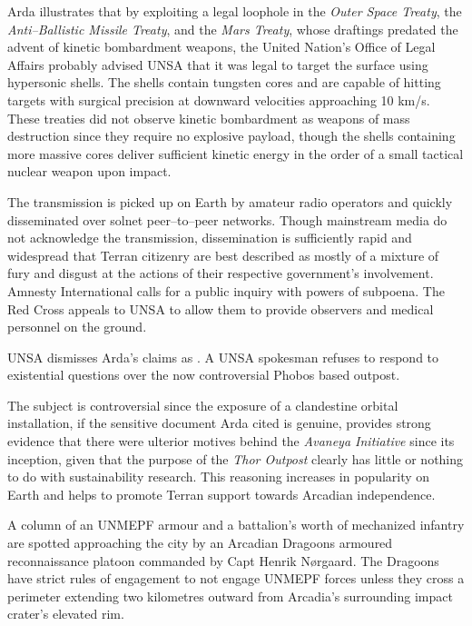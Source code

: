 Arda illustrates that by exploiting a legal loophole in the {\it Outer Space Treaty}, the {\it Anti--Ballistic Missile Treaty}, and the {\it Mars Treaty}, whose draftings predated the advent of kinetic bombardment weapons, the United Nation's Office of Legal Affairs probably advised UNSA that it was legal to target the surface using hypersonic shells. The shells contain tungsten cores and are capable of hitting targets with surgical precision at downward velocities approaching 10 km/s. These treaties did not observe kinetic bombardment as weapons of mass destruction since they require no explosive payload, though the shells containing more massive cores deliver sufficient kinetic energy in the order of a small tactical nuclear weapon upon impact.

The transmission is picked up on Earth by amateur radio operators and quickly disseminated over solnet peer--to--peer networks. Though mainstream media do not acknowledge the transmission, dissemination is sufficiently rapid and widespread that Terran citizenry are best described as mostly of a mixture of fury and disgust at the actions of their respective government's involvement. Amnesty International calls for a public inquiry with powers of subpoena. The Red Cross appeals to UNSA to allow them to provide observers and medical personnel on the ground.

UNSA dismisses Arda's claims as . A UNSA spokesman refuses to respond to existential questions over the now controversial Phobos based outpost. 

The subject is controversial since the exposure of a clandestine orbital installation, if the sensitive document Arda cited is genuine, provides strong evidence that there were ulterior motives behind the {\it Avaneya Initiative} since its inception, given that the purpose of the {\it Thor Outpost} clearly has little or nothing to do with sustainability research. This reasoning increases in popularity on Earth and helps to promote Terran support towards Arcadian independence.
\StopTimelineDate

A column of an UNMEPF armour and a battalion's worth of mechanized infantry are spotted approaching the city by an Arcadian Dragoons armoured reconnaissance platoon commanded by Capt Henrik Nørgaard. The Dragoons have strict rules of engagement to not engage UNMEPF forces unless they cross a perimeter extending two kilometres outward from Arcadia's surrounding impact crater's elevated rim.

